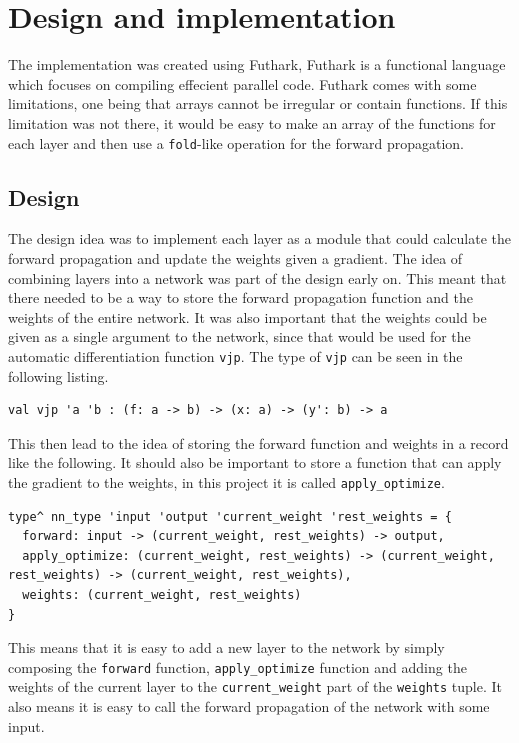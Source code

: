 \section{Design and implementation}

The implementation was created using Futhark, Futhark is a functional language which focuses on compiling effecient parallel code.
Futhark comes with some limitations, one being that arrays cannot be irregular or contain functions.
If this limitation was not there, it would be easy to make an array of the functions for each layer and then use a \texttt{fold}-like operation for the forward propagation.

\subsection{Design}

The design idea was to implement each layer as a module that could calculate the forward propagation and update the weights given a gradient.
The idea of combining layers into a network was part of the design early on.
This meant that there needed to be a way to store the forward propagation function and the weights of the entire network.
It was also important that the weights could be given as a single argument to the network, since that would be used for the automatic differentiation function \texttt{vjp}. The type of \texttt{vjp} can be seen in the following listing.
\begin{lstlisting}
val vjp 'a 'b : (f: a -> b) -> (x: a) -> (y': b) -> a
\end{lstlisting}

This then lead to the idea of storing the forward function and weights in a record like the following. It should also be important to store a function that can apply the gradient to the weights, in this project it is called \texttt{apply\_optimize}.

\begin{lstlisting}
type^ nn_type 'input 'output 'current_weight 'rest_weights = {
  forward: input -> (current_weight, rest_weights) -> output,
  apply_optimize: (current_weight, rest_weights) -> (current_weight, rest_weights) -> (current_weight, rest_weights),
  weights: (current_weight, rest_weights)
}
\end{lstlisting}

This means that it is easy to add a new layer to the network by simply composing the \texttt{forward} function, \texttt{apply\_optimize} function and adding the weights of the current layer to the \texttt{current\_weight} part of the \texttt{weights} tuple.
It also means it is easy to call the forward propagation of the network with some input.

